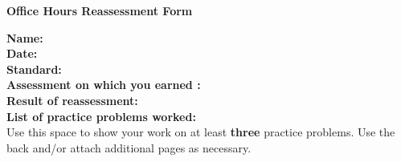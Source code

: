 \documentclass[letterpaper]{article}
\begin{document}
\begin{center}
{\Large \bf Office Hours Reassessment Form} \\
\large \course
\end{center}


	
\vspace{0.2in}

\begin{flushleft}
{\bf Name: } \underline{\phantom{xxxxxxxxxxxxxxxxxxxxxxxxxxxxxxxxxxxxxxxxxxxxxxxxxxxxxxxxx}} \\
\vspace{0.15in}
{\bf Date: } \underline{\phantom{xxxxxxxxxxxxxxxxxxxxxxxxxxxxxxxxxxxxxxxxxxxxxxxxxxxxxxxxx}} \\
\vspace{0.15in}
{\bf Standard: } \underline{\phantom{xxxxxxxxxxxxxxxxxxx}} \\
\vspace{0.15in}
{\bf Assessment on which you earned : } \underline{\phantom{xxxxxxxxxxxxxxxxxxxxxxxxxxxxx}} \\
\vspace{0.15in}
{\bf Result of reassessment: } \underline{\phantom{xxxxxxxxxxxxxxxxxxxxxxx}} \\
\vspace{0.15in}
{\bf List of practice problems worked: } \\
\vspace{0.4in}
Use this space to show your work on at least {\bf three} practice problems.  Use the back and/or attach additional pages as necessary.


\end{flushleft}
\end{document}
